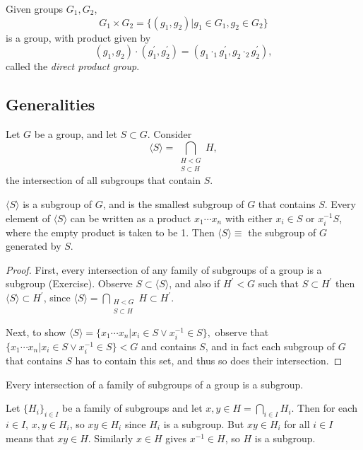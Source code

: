 \begin{defn}
  Given groups $G_1, G_2$,
  $$
  G_1 \times G_2 = \{(g_1, g_2) | g_1 \in G_1, g_2 \in G_2 \}
  $$
  is a group, with product given by
  $$
  (g_1, g_2) \cdot (g_1^\prime, g_2^\prime)
  = (g_1 \cdot_1 g_1^\prime, g_2 \cdot_2 g_2^\prime),
  $$
  called the \emph{direct product group}.
\end{defn}

\subsection{Generalities}
Let $G$ be a group, and let $S \subset G$. Consider
$$
\langle S \rangle = \bigcap_{\substack{H < G \\ S \subset H}} H,
$$
the intersection of all subgroups that contain $S$.

\begin{prop}
$\langle S \rangle$ is a subgroup of $G$, and is the smallest
subgroup of $G$ that contains $S$. Every element of $\langle S \rangle$
can be written as a product $x_1 \cdots x_n$ with either $x_i \in S$ or
$x_i^{-1} S$, where the empty product is taken to be 1. Then
$\langle S \rangle \equiv$ the subgroup of $G$ generated by $S$.
\end{prop}

\begin{proof}
First, every intersection of any family of subgroups of a group is a
subgroup (Exercise). Observe $S \subset \langle S \rangle$, and also if
$H^\prime < G$ such that $S \subset H^\prime$ then
$\langle S \rangle \subset H^\prime$, since
$\langle S \rangle = \bigcap_{\substack{H < G \\ S \subset H}} H \subset H^\prime$.

Next, to show
$\langle S \rangle = \{ x_1 \cdots x_n | x_i \in S \lor x_i^{-1} \in S \},$
observe that $\{ x_1 \cdots x_n | x_i \in S \lor x_i^{-1} \in S \} < G$ and
contains $S$, and in fact each subgroup of $G$ that contains $S$ has to
contain this set, and thus so does their intersection.
\end{proof}

\begin{Problem}
Every intersection of a family of subgroups of a group is a subgroup.
\end{Problem}
\begin{Answer}
Let $\{ H_i \}_{i \in I}$ be a family of subgroups and let
$x, y \in H = \bigcap_{i \in I} H_i$. Then for each $i \in I$,
$x, y \in H_i$, so $xy \in H_i$ since $H_i$ is a subgroup. But
$xy \in H_i$ for all $i \in I$ means that $xy \in H$. Similarly $x \in
H$ gives $x^{-1} \in H$, so $H$ is a subgroup.
\end{Answer}

